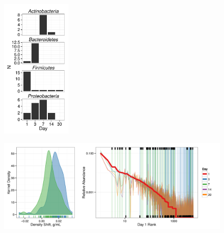 \begin{figure}[H]
	\begin{center}
	\centerline{\includegraphics[width=0.30\textwidth]{figures/xylose_rspndr_bar/xylose_rspndr_bar.pdf}}
	\caption{\protect}\label{fig:xyl_count}
        \end{center}
\end{figure}


\begin{figure}[H]
	\begin{center}
	\centerline{\includegraphics[width=\textwidth]{figures/shift_and_rabund1/shift_and_rabund.png}}

	\caption{\protect}\label{fig:shift}
        \end{center}
\end{figure}

